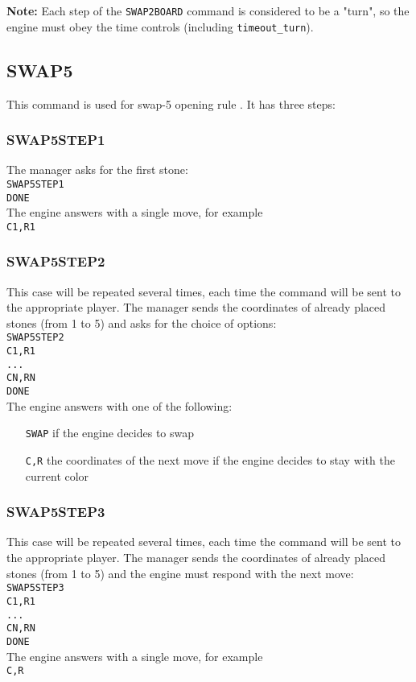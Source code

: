 \documentclass[12pt,a4paper]{article}
\begin{document}
\textbf{Note:} Each step of the \texttt{SWAP2BOARD} command is considered to be a "turn", so the engine must obey the time controls (including \texttt{timeout{\_}turn}).


\subsection{SWAP5}
\label{cmd_swap5}
This command is used for swap-5 opening rule \cite{renju_opening_rules}. It has three steps:

\subsubsection{SWAP5STEP1}
The manager asks for the first stone:\\
\texttt{SWAP5STEP1}\\
\texttt{DONE}\\
The engine answers with a single move, for example\\
\texttt{C1,R1}

\subsubsection{SWAP5STEP2}
This case will be repeated several times, each time the command will be sent to the appropriate player. The manager sends the coordinates of already placed stones (from 1 to 5) and asks for the choice of options:\\
\texttt{SWAP5STEP2}\\
\texttt{C1,R1}\\
\texttt{...}\\
\texttt{CN,RN}\\
\texttt{DONE}\\
The engine answers with one of the following:
\begin{enumerate}[leftmargin=7.5em]
\item[\texttt{SWAP}]{if the engine decides to swap}
\item[\texttt{C,R}]{the coordinates of the next move if the engine decides to stay with the current color}
\end{enumerate}

\subsubsection{SWAP5STEP3}
This case will be repeated several times, each time the command will be sent to the appropriate player. The manager sends the coordinates of already placed stones (from 1 to 5) and the engine must respond with the next move:\\
\texttt{SWAP5STEP3}\\
\texttt{C1,R1}\\
\texttt{...}\\
\texttt{CN,RN}\\
\texttt{DONE}\\
The engine answers with a single move, for example\\
\texttt{C,R}
\end{document}
